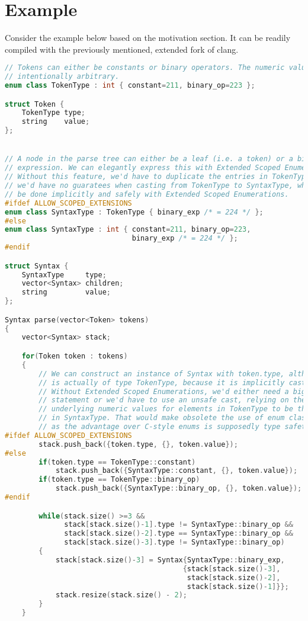 \documentclass{scrartcl}
\begin{document}
\section{Example}
Consider the example below based on the motivation section.
It can be readily compiled with the previously mentioned, extended fork of clang.

{\footnotesize
\begin{lstlisting}[language=C++]
// Tokens can either be constants or binary operators. The numeric values are
// intentionally arbitrary.
enum class TokenType : int { constant=211, binary_op=223 };

struct Token {
    TokenType type;
    string    value;
};


// A node in the parse tree can either be a leaf (i.e. a token) or a binary
// expression. We can elegantly express this with Extended Scoped Enumerations.
// Without this feature, we'd have to duplicate the entries in TokenType and
// we'd have no guaratees when casting from TokenType to SyntaxType, which can
// be done implicitly and safely with Extended Scoped Enumerations.
#ifdef ALLOW_SCOPED_EXTENSIONS
enum class SyntaxType : TokenType { binary_exp /* = 224 */ };
#else
enum class SyntaxType : int { constant=211, binary_op=223,
                              binary_exp /* = 224 */ };
#endif

struct Syntax {
    SyntaxType     type;
    vector<Syntax> children;
    string         value;
};

Syntax parse(vector<Token> tokens)
{
    vector<Syntax> stack;

    for(Token token : tokens)
    {
        // We can construct an instance of Syntax with token.type, although it
        // is actually of type TokenType, because it is implicitly cast.
        // Without Extended Scoped Enumerations, we'd either need a big switch
        // statement or we'd have to use an unsafe cast, relying on the
        // underlying numeric values for elements in TokenType to be the same as
        // in SyntaxType. That would make obsolete the use of enum class,
        // as the advantage over C-style enums is supposedly type safety.
#ifdef ALLOW_SCOPED_EXTENSIONS
        stack.push_back({token.type, {}, token.value});
#else
        if(token.type == TokenType::constant)
            stack.push_back({SyntaxType::constant, {}, token.value});
        if(token.type == TokenType::binary_op)
            stack.push_back({SyntaxType::binary_op, {}, token.value});
#endif

        while(stack.size() >=3 &&
              stack[stack.size()-1].type != SyntaxType::binary_op &&
              stack[stack.size()-2].type == SyntaxType::binary_op &&
              stack[stack.size()-3].type != SyntaxType::binary_op)
        {
            stack[stack.size()-3] = Syntax{SyntaxType::binary_exp,
                                          {stack[stack.size()-3],
                                           stack[stack.size()-2],
                                           stack[stack.size()-1]}};
            stack.resize(stack.size() - 2);
        }
    }


\end{lstlisting}}
\end{document}
